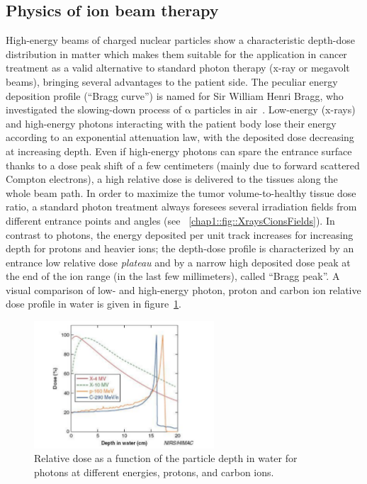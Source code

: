 \subsection{Physics of ion beam therapy}\label{chap1::subsec::Physics}
High-energy beams of charged nuclear particles show a characteristic depth-dose distribution in matter which makes them suitable for the application in cancer treatment as a valid alternative to standard photon therapy (x-ray or megavolt beams), bringing several advantages to the patient side. The peculiar energy deposition profile (\enquote{Bragg curve}) is named for Sir William Henri Bragg, who investigated the slowing-down process of $\mathrm{\alpha}$ particles in air~\parencite{Bragg1904, Bragg1905}. Low-energy (x-rays) and high-energy photons interacting with the patient body lose their energy according to an exponential attenuation law, with the deposited dose decreasing at increasing depth. Even if high-energy photons can spare the entrance surface thanks to a dose peak shift of a few centimeters (mainly due to forward scattered Compton electrons), a high relative dose is delivered to the tissues along the whole beam path. In order to maximize the tumor volume-to-healthy tissue dose ratio, a standard photon treatment always foresees several irradiation fields from different entrance points and angles (see \figurename~\ref{chap1::fig::XraysCionsFields}). In contrast to photons, the energy deposited per unit track increases for increasing depth for protons and heavier ions; the depth-dose profile is characterized by an entrance low relative dose \textit{plateau} and by a narrow high deposited dose peak at the end of the ion range (in the last few millimeters), called \enquote{Bragg peak}. A visual comparison of low- and high-energy photon, proton and carbon ion relative dose profile in water is given in figure~\ref{chap1::fig::Depth-doseProf}. 

\begin{figure}[!htbp]
\centering
\includegraphics[width=0.6\textwidth]{03_GraphicFiles/chapter1_Introduction/depthDoseProf.pdf}
\caption{Relative dose as a function of the particle depth in water for photons at different energies, protons, and carbon ions.}
\label{chap1::fig::Depth-doseProf}
\end{figure} 

